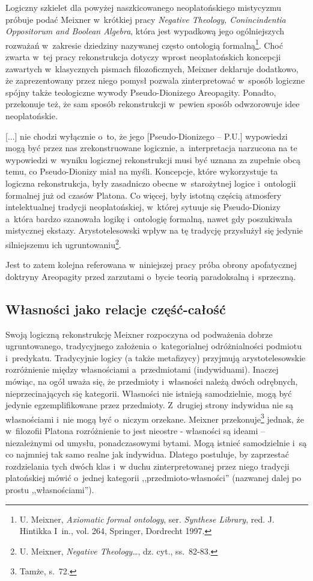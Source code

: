 Logiczny szkielet dla powyżej naszkicowanego neoplatońskiego mistycyzmu próbuje podać Meixner w~krótkiej pracy \textit{Negative Theology, Conincindentia Oppositorum and Boolean Algebra}, która jest wypadkową jego ogólniejszych rozważań w~zakresie dziedziny nazywanej często ontologią formalną\footnote{U. Meixner, \textit{Axiomatic formal ontology}, ser. \textit{Synthese Library}, red. J. Hintikka I~in., vol. 264, Springer, Dordrecht 1997.}. Choć zwarta w~tej pracy rekonstrukcja dotyczy wprost neoplatońskich koncepcji zawartych w~klasycznych pismach filozoficznych, Meixner deklaruje dodatkowo, że zaprezentowany przez niego pomysł pozwala zinterpretować w~sposób logiczne spójny także teologiczne wywody Pseudo-Dionizego Areopagity. Ponadto, przekonuje też, że sam sposób rekonstrukcji w~pewien sposób odwzorowuje idee neoplatońskie.

[...] nie chodzi wyłącznie o~to, że jego [Pseudo-Dionizego -- P.U.] wypowiedzi mogą być przez nas zrekonstruowane logicznie, a~interpretacja narzucona na te wypowiedzi w~wyniku logicznej rekonstrukcji musi być uznana za zupełnie obcą temu, co Pseudo-Dionizy miał na myśli. Koncepcje, które wykorzystuje ta logiczna rekonstrukcja, były zasadniczo obecne w~starożytnej logice i~ontologii formalnej już od czasów Platona. Co więcej, były istotną częścią atmosfery intelektualnej tradycji neoplatońskiej, w~której sytuuje się Pseudo-Dionizy a~która bardzo szanowała logikę i~ontologię formalną, nawet gdy poszukiwała mistycznej ekstazy. Arystotelesowski wpływ na tę tradycję przysłużył się jedynie silniejszemu ich ugruntowaniu\footnote{U. Meixner, \textit{Negative Theology}…, dz. cyt., ss.~82-83.}.

Jest to zatem kolejna referowana w~niniejszej pracy próba obrony apofatycznej doktryny Areopagity przed zarzutami o~bycie teorią paradoksalną i~sprzeczną.

\subsection{Własności jako relacje część-całość}

Swoją logiczną rekonstrukcję Meixner rozpoczyna od podważenia dobrze ugruntowanego, tradycyjnego założenia o~kategorialnej odróżnialności podmiotu i~predykatu. Tradycyjnie logicy (a także metafizycy) przyjmują arystotelesowskie rozróżnienie między własnościami a~przedmiotami (indywiduami). Inaczej mówiąc, na ogół uważa się, że przedmioty i~własności należą dwóch odrębnych, nieprzecinających się kategorii. Własności nie istnieją samodzielnie, mogą być jedynie egzemplifikowane przez przedmioty. Z~drugiej strony indywidua nie są własnościami i~nie mogą być o~niczym orzekane. Meixner przekonuje\footnote{Tamże, s.~72.} jednak, że w~filozofii Platona rozróżnienie to jest nieostre - własności są ideami -- niezależnymi od umysłu, ponadczasowymi bytami. Mogą istnieć samodzielnie i~są co najmniej tak samo realne jak indywidua. Dlatego postuluje, by zaprzestać rozdzielania tych dwóch klas i~w duchu zinterpretowanej przez niego tradycji platońskiej mówić o~jednej kategorii ,,przedmioto-własności'' (nazwanej dalej po prostu ,,własnościami'').

